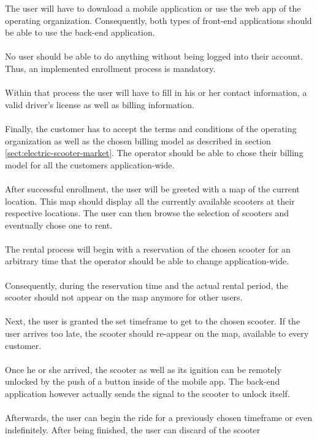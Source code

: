 \documentclass[12pt,a4paper,twoside]{report}
\begin{document}
The user will have to download a mobile application or use the web app
of the operating organization. Consequently, both types of front-end applications
should be able to use the back-end application.\\\\
No user should be able to do anything without being logged into their account.
Thus, an implemented enrollment process is mandatory.\\\\
Within that process the user will have to fill in his or her
contact information, a valid driver's license as well as billing information.\\\\
Finally, the customer has to accept the terms and conditions of the operating
organization as well as the chosen billing model as described in
section \ref{sect:electric-scooter-market}. The operator should be able to chose
their billing model for all the customers application-wide.\\\\
After successful enrollment, the user will be greeted with a map of the current
location. This map should display all the currently available scooters at
their respective locations. The user can then browse the selection
of scooters and eventually chose one to rent.\\\\
The rental process will begin with a reservation of the chosen scooter for
an arbitrary time that the operator should be able to change application-wide.\\\\
Consequently, during the reservation time and the actual rental period,
the scooter should not appear on the map anymore for other users.\\\\
Next, the user is granted the set timeframe to get to the chosen scooter.
If the user arrives too late, the scooter should re-appear on the map,
available to every customer.\\\\
Once he or she arrived, the scooter as well as its ignition can be remotely
unlocked by the push of a button inside of the mobile app.
The back-end application however actually sends the signal to the scooter to
unlock itself.\\\\
Afterwards, the user can begin the ride for a previously chosen timeframe
or even indefinitely. After being finished, the user can discard of the scooter
\end{document}
